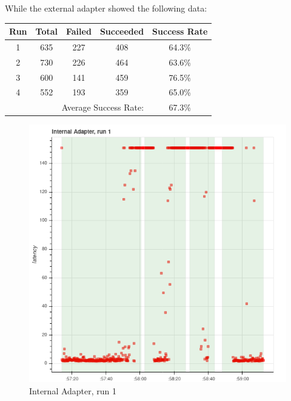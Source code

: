 \documentclass{IEEEtran}
\begin{document}
While the external adapter showed the following data:

\begin{tabular}{ c | c | c | c | c }
  Run & Total & Failed & Succeeded & Success Rate \\ \hline
  1 & 635 & 227 & 408 & 64.3\% \\
  2 & 730 & 226 & 464 & 63.6\% \\
  3 & 600 & 141 & 459 & 76.5\% \\
  4 & 552 & 193 & 359 & 65.0\% \\
  \hline
  \multicolumn{4}{r}{Average Success Rate:} & 67.3\%
\end{tabular}

\begin{figure}
  \includegraphics[width=\linewidth]{internal-1.png}
  \caption{Internal Adapter, run 1}
  \label{fig:int1}
\end{figure}
\end{document}

